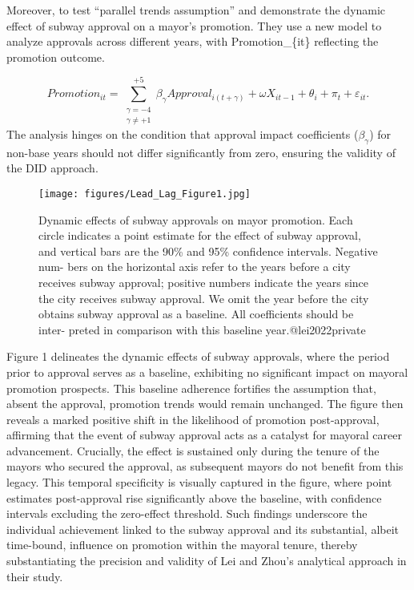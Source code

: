 \documentclass[12pt, ]{article}
\begin{document}
Moreover, to test ``parallel trends assumption'' and demonstrate the
dynamic effect of subway approval on a mayor's promotion. They use a new
model to analyze approvals across different years, with
Promotion\_\{it\} reflecting the promotion outcome.

\[Promotion_{it} = \sum_{\substack{\gamma=-4 \\ \gamma \neq +1}}^{+5} \beta_{\gamma} Approval_{i(t+\gamma)} + \omega X_{it-1} + \theta_i + \pi_t + \varepsilon_{it}.\]
The analysis hinges on the condition that approval impact coefficients
(\(\beta_\gamma\)) for non-base years should not differ significantly
from zero, ensuring the validity of the DID approach.

\begin{figure}[tbp]

{\centering \texttt{[image: figures/Lead\_Lag\_Figure1.jpg]}

}

\caption{\label{fig-example}Dynamic effects of subway approvals on mayor
promotion. Each circle indicates a point estimate for the effect of
subway approval, and vertical bars are the 90\% and 95\% confidence
intervals. Negative num- bers on the horizontal axis refer to the years
before a city receives subway approval; positive numbers indicate the
years since the city receives subway approval. We omit the year before
the city obtains subway approval as a baseline. All coefficients should
be inter- preted in comparison with this baseline year.@lei2022private}

\end{figure}

Figure 1 delineates the dynamic effects of subway approvals, where the
period prior to approval serves as a baseline, exhibiting no significant
impact on mayoral promotion prospects. This baseline adherence fortifies
the assumption that, absent the approval, promotion trends would remain
unchanged. The figure then reveals a marked positive shift in the
likelihood of promotion post-approval, affirming that the event of
subway approval acts as a catalyst for mayoral career advancement.
Crucially, the effect is sustained only during the tenure of the mayors
who secured the approval, as subsequent mayors do not benefit from this
legacy. This temporal specificity is visually captured in the figure,
where point estimates post-approval rise significantly above the
baseline, with confidence intervals excluding the zero-effect threshold.
Such findings underscore the individual achievement linked to the subway
approval and its substantial, albeit time-bound, influence on promotion
within the mayoral tenure, thereby substantiating the precision and
validity of Lei and Zhou's analytical approach in their study.
\end{document}

